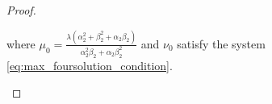 \documentclass{article}
\newcommand{\0}{\textbf{0}}
\newcommand{\1}{\textbf{1}}
\newcommand{\TRACE}{\operatorname{Tr}_1^k}
\theoremstyle{plain}
\theoremstyle{nonumberplain}
\begin{document}
\begin{proof}
\begin{enumerate}[label=\textbf{Case \arabic*}]
    where $ \mu_0=\frac{\lambda(\alpha_2^2+\beta_2^2+\alpha_2\beta_2)}{\alpha_2^2\beta_2+\alpha_2\beta_2^2} $ 
    and $ \nu_0 $ satisfy the system \eqref{eq:max_foursolution_condition}. 

    \end{enumerate}
    \end{proof}
        
    

\end{document}
